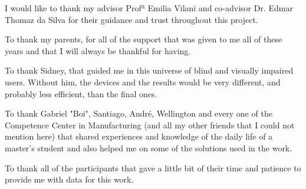 
I would like to thank my advisor Profª Emilia Vilani and co-advisor Dr. Edmar Thomaz da Silva for their guidance and trust throughout this project.

To thank my parents, for all of the support that was given to me all of these years and that I will always be thankful for having.

To thank Sidney, that guided me in this universe of blind and visually impaired users. Without him, the devices and the results would be very different, and probably less efficient, than the final ones.

To thank Gabriel "Boi", Santiago, André, Wellington and every one of the Competence Center in Manufacturing (and all my other friends that I could not mention here) that shared experiences and knowledge of the daily life of a master's student and also helped me on some of the solutions used in the work.

To thank all of the participants that gave a little bit of their time and patience to provide me with data for this work.
